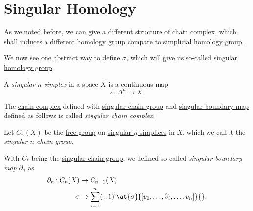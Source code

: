 \section{Singular Homology}
As we noted before, we can give a different structure of \hyperref[def:chain-complex]{chain complex}, which shall
induces a different \hyperref[def:homology-group]{homology group} compare to \hyperref[def:simplicial-homology-group]{simplicial homology group}.

We now see one abstract way to define \(\sigma \), which will give us so-called \hyperref[def:singular-homology-group]{singular homology group}.

\begin{definition}\label{def:singular-simplex}
	A \emph{singular \(n\)-simplex} in a space \(X\) is a continuous map
	\[
		\sigma \colon \Delta^n \to X.
	\]
\end{definition}

\begin{definition}\label{def:singular-chain-complex}
	The \hyperref[def:chain-complex]{chain complex} defined with \hyperref[def:singular-chain-group]{singular chain group} and
	\hyperref[def:singular-boundary-map]{singular boundary map} defined as follows is called \emph{singular chain complex}.
	\begin{definition}\label{def:singular-chain-group}
		Let \(C_n(X)\) be the \hyperref[def:free-group]{free group} on \hyperref[def:singular-simplex]{singular \(n\)-simplices} in \(X\), which we
		call it the \emph{singular \(n\)-chain group}.
	\end{definition}
	\begin{definition}\label{def:singular-boundary-map}
		With \(C_\ast\) being the \hyperref[def:singular-chain-group]{singular chain group}, we defined so-called \emph{singular boundary map} \(\partial _n\) as
		\[
			\begin{split}
				\partial_n \colon C_n(X) & \to C_{n - 1}(X)                                                                       \\
				\sigma              & \mapsto \sum_{i = 1}^n (-1)^i \at{\sigma}{[v_0, \ldots, \widehat{v}_i, \ldots, v_n]}{}.
			\end{split}
		\]
	\end{definition}
\end{definition}

